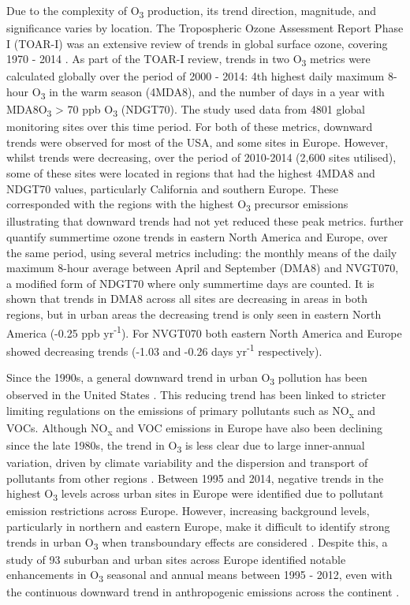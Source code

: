 \documentclass[journal abbreviation, manuscript]{copernicus}
\begin{document}
Due to the complexity of O\textsubscript{3} production, its trend direction, magnitude, and significance varies by location. The Tropospheric Ozone Assessment Report Phase I (TOAR-I) was an extensive review of trends in global surface ozone, covering 1970 - 2014 \citep{fleming_2018, Gaudel2018}. As part of the TOAR-I review, trends in two O\textsubscript{3} metrics were calculated globally over the period of 2000 - 2014: 4th highest daily maximum 8-hour O\textsubscript{3} in the warm season (4MDA8), and the number of days in a year with MDA8O\textsubscript{3} > 70 ppb O\textsubscript{3} (NDGT70). The study used data from 4801 global monitoring sites over this time period. For both of these metrics, downward trends were observed for most of the USA, and some sites in Europe. However, whilst trends were decreasing, over the period of 2010-2014 (2,600 sites utilised), some of these sites were located in regions that had the highest 4MDA8 and NDGT70 values, particularly California and southern Europe. These corresponded with the regions with the highest O\textsubscript{3} precursor emissions illustrating that downward trends had not yet reduced these peak metrics. \cite{Chang_2017} further quantify summertime ozone trends in eastern North America and Europe, over the same period, using several metrics including: the monthly means of the daily maximum 8-hour average between April and September (DMA8) and NVGT070, a modified form of NDGT70 where only summertime days are counted. It is shown that trends in DMA8 across all sites are decreasing in areas in both regions, but in urban areas the decreasing trend is only seen in eastern North America (-0.25 ppb yr\textsuperscript{-1}). For NVGT070 both eastern North America and Europe showed decreasing trends (-1.03 and -0.26 days yr\textsuperscript{-1} respectively).

Since the 1990s, a general downward trend in urban O\textsubscript{3} pollution has been observed in the United States \citep{acp-20-3191-2020}. This reducing trend has been linked to stricter limiting regulations on the emissions of primary pollutants such as NO\textsubscript{x} and VOCs. Although NO\textsubscript{x} and VOC emissions in Europe have also been declining since the late 1980s, the trend in O\textsubscript{3} is less clear due to large inner-annual variation, driven by climate variability and the dispersion and transport of pollutants from other regions \citep{acp-6-51-2006, acp-18-5589-2018}. Between 1995 and 2014, negative trends in the highest O\textsubscript{3} levels across urban sites in Europe were identified due to pollutant emission restrictions across Europe. However, increasing background levels, particularly in northern and eastern Europe, make it difficult to identify strong trends in urban O\textsubscript{3} when transboundary effects are considered \citep{acp-18-5589-2018}. Despite this, a study of 93 suburban and urban sites across Europe identified notable enhancements in O\textsubscript{3} seasonal and annual means between 1995 - 2012, even with the continuous downward trend in anthropogenic emissions across the continent \citep{acp-18-5589-2018}.
\end{document}
